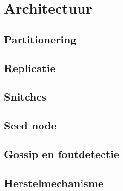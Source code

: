 \chapter{Architectuur}
\label{ch:cassandra_architectuur}

\section{Partitionering}
\section{Replicatie}
\section{Snitches}
\section{Seed node}
\section{Gossip en foutdetectie}
\section{Herstelmechanisme}
